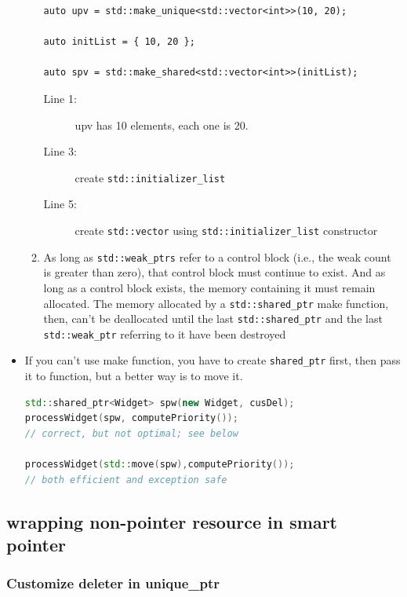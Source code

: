 \documentclass[a4paper,11pt,twoside]{book}
\begin{document}
\begin{itemize}
\begin{enumerate}
\begin{lstlisting}
auto upv = std::make_unique<std::vector<int>>(10, 20);

auto initList = { 10, 20 };

auto spv = std::make_shared<std::vector<int>>(initList);
\end{lstlisting}
\begin{description}
	\item[Line 1:] upv has 10 elements, each one is 20.
	\item[Line 3:] create \texttt{std::initializer\_list}
	\item[Line 5:] create \texttt{std::vector} using \texttt{std::initializer\_list} constructor
\end{description}
		
		\item As long as \texttt{std::weak\_ptrs} refer to a control block (i.e., the weak count is greater than zero), that control block must continue to exist. And as long as a control block exists, the memory containing it must remain allocated. The memory allocated by a \texttt{std::shared\_ptr} make function, then, can't be deallocated until the last \texttt{std::shared\_ptr} and the last \texttt{std::weak\_ptr} referring to it have been destroyed
	\end{enumerate}
	
	\item If you can't use make function, you have to create \texttt{shared\_ptr} first, then pass it to function, but a better way is to move it.
\begin{lstlisting}[frame=single, language=c++]
std::shared_ptr<Widget> spw(new Widget, cusDel);
processWidget(spw, computePriority()); 
// correct, but not optimal; see below

processWidget(std::move(spw),computePriority());  
// both efficient and exception safe
\end{lstlisting}
	
\end{itemize}

\subsection{wrapping non-pointer resource in smart pointer}

\subsubsection{Customize deleter in unique\_ptr}
\end{document}
